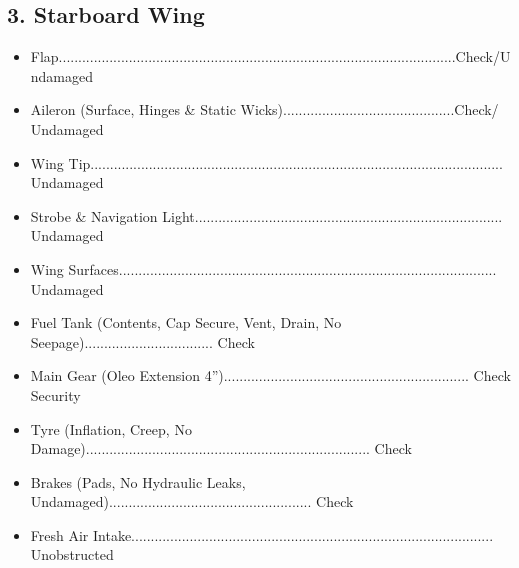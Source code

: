 \documentclass[a4paper]{article}
\newenvironment{checklist}{
  \begin{itemize}[leftmargin=*, align=left]
    \setlength{\itemsep}{2pt}
    \setlength{\parskip}{0pt}
    \setlength{\parsep}{0pt}
}{
  \end{itemize}
}
\begin{document}
\subsection*{3. Starboard Wing}
\begin{checklist}
\item Flap......................................................................................................Check/Undamaged
\item Aileron (Surface, Hinges \& Static Wicks)............................................Check/ Undamaged
\item Wing Tip.......................................................................................................... Undamaged
\item Strobe \& Navigation Light............................................................................... Undamaged
\item Wing Surfaces................................................................................................. Undamaged
\item Fuel Tank (Contents, Cap Secure, Vent, Drain, No Seepage)................................. Check
\item Main Gear (Oleo Extension 4\textonehalf”)............................................................... Check Security
\item Tyre (Inflation, Creep, No Damage)......................................................................... Check
\item Brakes (Pads, No Hydraulic Leaks, Undamaged).................................................... Check
\item Fresh Air Intake............................................................................................. Unobstructed
\end{checklist}
\end{document}
